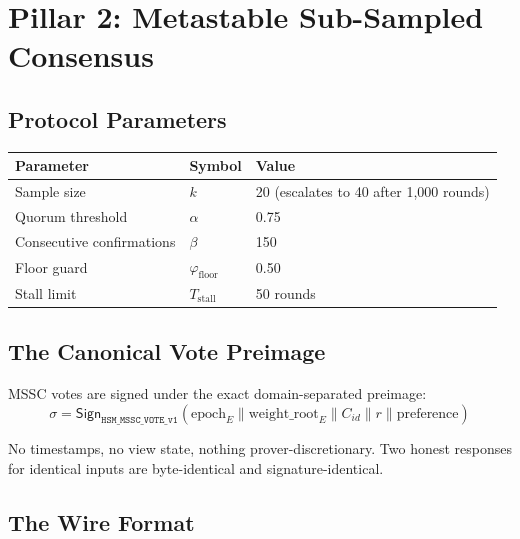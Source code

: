 \documentclass[11pt, a4paper]{article}
\theoremstyle{plain}
\theoremstyle{definition}
\theoremstyle{remark}
\begin{document}
\section{Pillar 2: Metastable Sub-Sampled Consensus}
\label{sec:mssc}

\subsection{Protocol Parameters}

\begin{table}[h]
\centering
{}
\begin{tabular}{lll}
\rowcolor{hsmaTeal!20} \textbf{Parameter} & \textbf{Symbol} & \textbf{Value} \\
\midrule
Sample size & $k$ & 20 (escalates to 40 after 1{,}000 rounds) \\
Quorum threshold & $\alpha$ & 0.75 \\
Consecutive confirmations & $\beta$ & 150 \\
Floor guard & $\varphi_{\text{floor}}$ & 0.50 \\
Stall limit & $T_{\text{stall}}$ & 50 rounds \\
\bottomrule
\end{tabular}
\end{table}

\subsection{The Canonical Vote Preimage}

MSSC votes are signed under the exact domain-separated preimage:
\begin{equation}
\sigma = \mathsf{Sign}_{\texttt{HSM\_MSSC\_VOTE\_v1}}\!\left(
\text{epoch}_E \| \text{weight\_root}_E \| C_{id} \| r \| \text{preference}
\right)
\end{equation}

No timestamps, no view state, nothing prover-discretionary. Two honest
responses for identical inputs are byte-identical and
signature-identical.

\subsection{The Wire Format}
\end{document}
